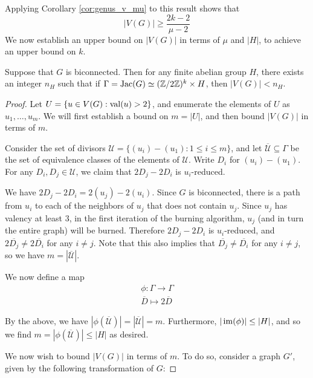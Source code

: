 \documentclass{amsart}
\begin{document}
Applying Corollary \ref{cor:genus_v_mu} to this result shows that 
\begin{equation*}
  |V(G)| \ge \frac{2k-2}{\mu - 2}
\end{equation*}
We now establish an upper bound on $|V(G)|$ in terms of $\mu$ and
$|H|$, to achieve an upper bound on $k$.

\begin{prop}
  \label{prop:v_bound}
  Suppose that $G$ is biconnected. Then for any finite abelian group
  $H$, there exists an integer $n_H$ such that if $\Gamma = \operatorname{Jac}(G)
  \simeq (\mathbb{Z}/2\mathbb{Z})^k \times H$, then $|V(G)| < n_H$.
\end{prop}

\begin{proof}
  Let $U = \{u \in V(G) : \operatorname{val}(u) > 2\}$, and enumerate the elements
  of $U$ as $u_1, \ldots, u_m$. We will first establish a bound on
  $m = |U|$, and then bound $|V(G)|$ in terms of $m$.
  
  Consider the set of divisors $\mathcal{U} = \{(u_i) - (u_1) : 1 \le
  i \le m\}$, and let $\overline{\mathcal{U}} \subseteq \Gamma$ be the
  set of equivalence classes of the elements of $\mathcal{U}$. Write
  $D_i$ for $(u_i) - (u_1)$. For any $D_i, D_j \in \mathcal{U}$, we
  claim that $2D_j - 2D_i$ is $u_i$-reduced.

  We have $2D_j - 2D_i = 2(u_j) - 2(u_i)$. Since $G$ is biconnected,
  there is a path from $u_i$ to each of the neighbors of $u_j$ that
  does not contain $u_j$. Since $u_j$ has valency at least $3$, in the
  first iteration of the burning algorithm, $u_j$ (and in turn the
  entire graph) will be burned. Therefore $2D_j - 2D_i$ is
  $u_i$-reduced, and $2\overline{D_j} \ne 2\overline{D_i}$ for any $i
  \ne j$. Note that this also implies that $\overline{D_j} \ne
  \overline{D_i}$ for any $i \ne j$, so we have
  $m=|\overline{\mathcal{U}}|$.

  We now define a map
  \begin{align*}
    \phi: \Gamma \to \Gamma \\
    \overline{D} \mapsto 2\overline{D}
  \end{align*}

  By the above, we have
  $|\phi(\overline{\mathcal{U}})|=|\overline{\mathcal{U}}|=m$. Furthermore,
  $|\operatorname{im}(\phi)| \le |H|$, and so we find
  $m=|\phi(\overline{\mathcal{U}})| \le |H|$ as desired.

  We now wish to bound $|V(G)|$ in terms of $m$. To do so, consider a
  graph $G'$, given by the following transformation of $G$:


\end{proof}
\end{document}

